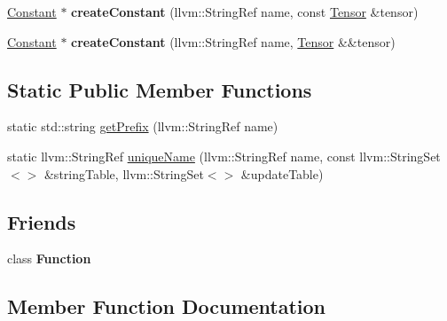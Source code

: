 \begin{Indent}
\begin{DoxyCompactItemize}
\item 
\mbox{\label{classglow_1_1_module_a83c282631e170a53b3ef5a6e67810192}} 
\hyperlink{classglow_1_1_constant}{Constant} $\ast$ {\bfseries create\+Constant} (llvm\+::\+String\+Ref name, const \hyperlink{classglow_1_1_tensor}{Tensor} \&tensor)
\item 
\mbox{\label{classglow_1_1_module_aff2c4dbe7cd72a2524854e9eccdd7073}} 
\hyperlink{classglow_1_1_constant}{Constant} $\ast$ {\bfseries create\+Constant} (llvm\+::\+String\+Ref name, \hyperlink{classglow_1_1_tensor}{Tensor} \&\&tensor)
\end{DoxyCompactItemize}
\end{Indent}
\subsection*{Static Public Member Functions}
\begin{DoxyCompactItemize}
\item 
static std\+::string \hyperlink{classglow_1_1_module_a467e5429bf807b3587748366c5a3bfd8}{get\+Prefix} (llvm\+::\+String\+Ref name)
\item 
static llvm\+::\+String\+Ref \hyperlink{classglow_1_1_module_a299f2b5203794b857dcb75d0ad069758}{unique\+Name} (llvm\+::\+String\+Ref name, const llvm\+::\+String\+Set$<$$>$ \&string\+Table, llvm\+::\+String\+Set$<$$>$ \&update\+Table)
\end{DoxyCompactItemize}
\subsection*{Friends}
\begin{DoxyCompactItemize}
\item 
\mbox{\label{classglow_1_1_module_ab7194606aa12931e96f8f5448d418ed0}} 
class {\bfseries Function}
\end{DoxyCompactItemize}


\subsection{Member Function Documentation}
\mbox{\label{classglow_1_1_module_a4659c5ffb8ce5f876bb8ae0217dfbd2c}} 
